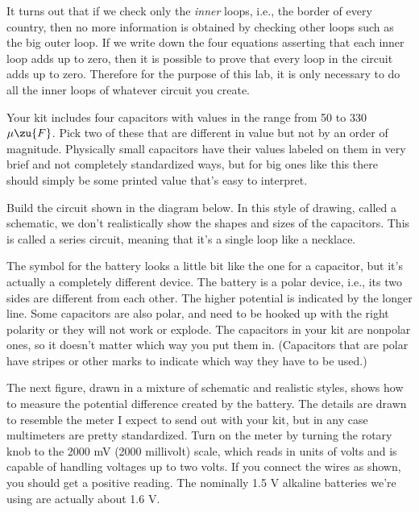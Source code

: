 It turns out that if we check only the \emph{inner} loops, i.e., the border of every country,
then no more information is obtained by checking other loops such as the big outer loop. If we write down the four equations
asserting that each inner loop adds up to zero, then it is possible to prove that every loop in the circuit adds up to
zero. Therefore for the purpose of this lab, it is only necessary to do all the inner loops of whatever circuit you create.

\observations

\setcounter{labpartctr}{0}


Your kit includes four capacitors with values in the range from 50 to 330 $\mu\zu{F}$.
Pick two of these that are different in value but not by an order of magnitude.
Physically small capacitors have their values labeled on them in very brief and
not completely standardized ways, but for big ones like this there should simply
be some printed value that's easy to interpret.

Build the circuit shown in the diagram below. In this style of drawing, called
a schematic, we don't realistically show the shapes and sizes of the capacitors.
This is called a series circuit, meaning that it's a single loop like a necklace.


The symbol for the battery looks a little bit like the one for a capacitor, but
it's actually a completely different device.
The battery is a polar device, i.e., its two sides are different from each other.
The higher potential is indicated by the longer line.
Some capacitors are also polar, and need to be hooked up with the right polarity
or they will not work or explode. The capacitors in your kit are nonpolar ones,
so it doesn't matter which way you put them in. (Capacitors that are polar have
stripes or other marks to indicate which way they have to be used.)

The next figure, drawn in a mixture of schematic and realistic styles,
shows how to measure the potential difference created by the
battery. The details are drawn to resemble the meter I expect to send out with
your kit, but in any case multimeters are pretty standardized. Turn on the
meter by turning the rotary knob to the 2000 mV (2000 millivolt) scale, which reads in units of
volts and is capable of handling voltages up to two volts. If you connect the wires
as shown, you should get a positive reading. The nominally 1.5 V alkaline batteries
we're using are actually about 1.6 V.

